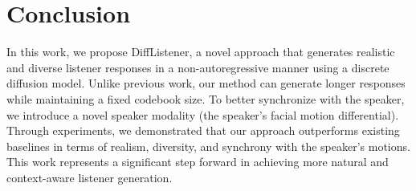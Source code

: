 \section{Conclusion}
In this work, we propose DiffListener, a novel approach that generates realistic and diverse listener responses in a non-autoregressive manner using a discrete diffusion model.
Unlike previous work, our method can generate longer responses while maintaining a fixed codebook size. 
To better synchronize with the speaker, we introduce a novel speaker modality (the speaker's facial motion differential).
Through experiments, we demonstrated that our approach outperforms existing baselines in terms of realism, diversity, and synchrony with the speaker's motions.
This work represents a significant step forward in achieving more natural and context-aware listener generation.